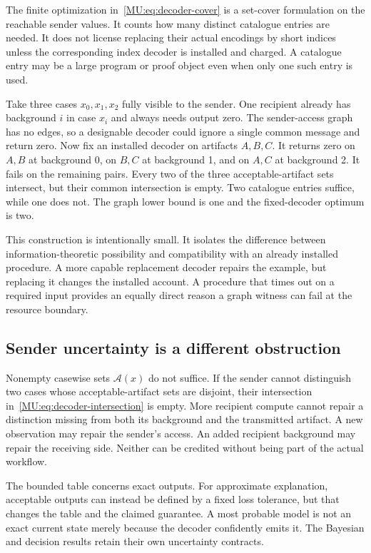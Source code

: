 The finite optimization in~\eqref{MU:eq:decoder-cover} is a set-cover formulation on the reachable sender values. It counts how many distinct catalogue entries are needed. It does not license replacing their actual encodings by short indices unless the corresponding index decoder is installed and charged. A catalogue entry may be a large program or proof object even when only one such entry is used.

\begin{MUcounterexample}\label{MU:ex:fixed-codebook}
Take three cases $x_0,x_1,x_2$ fully visible to the sender. One recipient already has background $i$ in case $x_i$ and always needs output zero. The sender-access graph has no edges, so a designable decoder could ignore a single common message and return zero. Now fix an installed decoder on artifacts $A,B,C$. It returns zero on $A,B$ at background 0, on $B,C$ at background 1, and on $A,C$ at background 2. It fails on the remaining pairs. Every two of the three acceptable-artifact sets intersect, but their common intersection is empty. Two catalogue entries suffice, while one does not. The graph lower bound is one and the fixed-decoder optimum is two.
\end{MUcounterexample}

This construction is intentionally small. It isolates the difference between information-theoretic possibility and compatibility with an already installed procedure. A more capable replacement decoder repairs the example, but replacing it changes the installed account. A procedure that times out on a required input provides an equally direct reason a graph witness can fail at the resource boundary.

\subsection{Sender uncertainty is a different obstruction}
Nonempty casewise sets $\mathcal A(x)$ do not suffice. If the sender cannot distinguish two cases whose acceptable-artifact sets are disjoint, their intersection in~\eqref{MU:eq:decoder-intersection} is empty. More recipient compute cannot repair a distinction missing from both its background and the transmitted artifact. A new observation may repair the sender's access. An added recipient background may repair the receiving side. Neither can be credited without being part of the actual workflow.

The bounded table concerns exact outputs. For approximate explanation, acceptable outputs can instead be defined by a fixed loss tolerance, but that changes the table and the claimed guarantee. A most probable model is not an exact current state merely because the decoder confidently emits it. The Bayesian and decision results retain their own uncertainty contracts.

